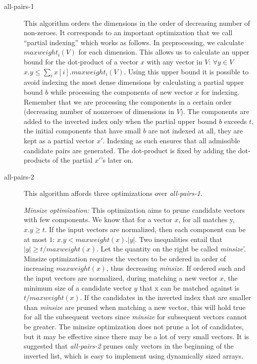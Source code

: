 \documentclass{comjnl}
\newcommand{\var}[1]{\mbox{\textsl{#1}}} %
\begin{document}
\begin{description}
\item[all-pairs-1] This algorithm orders the dimensions in the order
  of decreasing number of non-zeroes. It corresponds to an important
  optimization that we call ``partial indexing'' which works as
  follows. In preprocessing, we calculate $maxweight_i(V)$ for each
  dimension. This allows us to calculate an upper bound for the
  dot-product of a vector $x$ with any vector in $V$: $ \forall y \in
  V$ $x.y \leq \sum_{i}x[i].maxweight_i(V)$. Using this upper bound it
  is possible to avoid indexing the most dense dimensions by
  calculating a partial upper bound $b$ while processing the
  components of new vector $x$ for indexing. Remember that we are
  processing the components in a certain order (decreasing number of
  nonzeroes of dimensions in $V$). The components are added to the
  inverted index only when the partial upper bound $b$ exceeds $t$,
  the initial components that have small $b$ are not indexed at all,
  they are kept as a partial vector $x'$. Indexing as such ensures
  that all admissible candidate pairs are generated. The dot-product
  is fixed by adding the dot-products of the partial $x'$'s later on.
\item[all-pairs-2] This algorithm affords three optimizations over
  \var{all-pairs-1}.

  \emph{Minsize optimization:} This optimization aims to prune
  candidate vectors with few components.  We know that for a vector
  $x$, for all matches y, $x.y \geq t$.  If the input vectors are
  normalized, then each component can be at most $1$: $x.y <
  maxweight(x) . |y|$. Two inequalities entail that $|y|\geq
  t/maxweight(x)$. Let the quantity on the right be called
  \emph{minsize}'.  Minsize optimization requires the vectors to be
  ordered in order of increasing $maxweight(x)$, thus decreasing
  \emph{minsize}.  If ordered such and the input vectors are normalized,
  during matching a new vector $x$, the minimum size of a candidate
  vector $y$ that x can be matched against is $t/maxweight(x)$. If the
  candidates in the inverted index that are smaller than \emph{minsize} are
  pruned when matching a new vector, this will hold true for all the
  subsequent vectors since \emph{minsize} for subsequent vectors cannot be
  greater. The minsize optimization does not prune a lot of
  candidates, but it may be effective since there may be a lot of very
  small vectors.  It is suggested that \var{all-pairs-2} prunes only vectors
  in the beginning of the inverted list, which is easy to implement
  using dynamically sized arrays.


\end{description}
\end{document}
